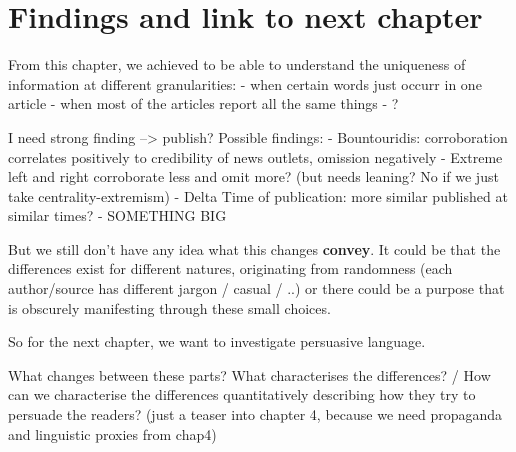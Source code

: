 



\section{Findings and link to next chapter}
\label{sec:cgs_findings}

From this chapter, we achieved to be able to understand the uniqueness of information at different granularities:
- when certain words just occurr in one article
- when most of the articles report all the same things
- ?

I need strong finding --> publish?
Possible findings:
- Bountouridis: corroboration correlates positively to credibility of news outlets, omission negatively
- Extreme left and right corroborate less and omit more? (but needs leaning? No if we just take centrality-extremism)
- Delta Time of publication: more similar published at similar times?
- SOMETHING BIG

But we still don't have any idea what this changes \textbf{convey}. It could be that the differences exist for different natures, originating from randomness (each author/source has different jargon / casual / ..) or there could be a purpose that is obscurely manifesting through these small choices.

So for the next chapter, we want to investigate persuasive language. 

What changes between these parts? What characterises the differences? / How can we characterise the differences quantitatively describing how they try to persuade the readers? (just a teaser into chapter 4, because we need propaganda and linguistic proxies from chap4)
